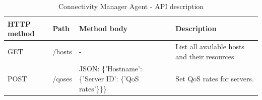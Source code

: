 \begin{table}[H]
\centering

\begin{tabularx}{\textwidth}{ |X|X|X|X| }
\hline HTTP method & Path & Method body & Description \\ 
\hline GET & /hosts & - & List all available hosts and their resources \\ 
\hline POST & /qoses & JSON: \{'Hostname': \{'Server ID': \{'QoS rates'\}\}\} & Set QoS rates for servers. \\ 
\hline 
\end{tabularx}

\caption{Connectivity Manager Agent - API description}
\end{table}


